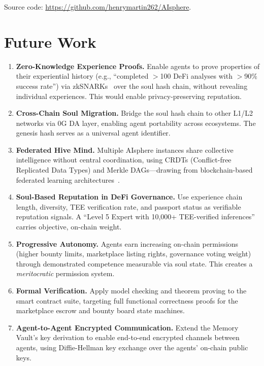 \documentclass[10pt,a4paper]{article}
\theoremstyle{definition}
\theoremstyle{plain}
\begin{document}
\noindent Source code: \url{https://github.com/henrymartin262/AIsphere}.


\section{Future Work}
\label{sec:future}

\begin{enumerate}[leftmargin=1.8em, itemsep=4pt, parsep=0pt]
  \item \textbf{Zero-Knowledge Experience Proofs.} Enable agents to prove properties of their experiential history (e.g., ``completed $>$100 DeFi analyses with $>$90\% success rate'') via zkSNARKs~\cite{zkml2024, zkml-survey2025} over the soul hash chain, without revealing individual experiences. This would enable privacy-preserving reputation.

  \item \textbf{Cross-Chain Soul Migration.} Bridge the soul hash chain to other L1/L2 networks via 0G DA layer, enabling agent portability across ecosystems. The genesis hash serves as a universal agent identifier.

  \item \textbf{Federated Hive Mind.} Multiple AIsphere instances share collective intelligence without central coordination, using CRDTs (Conflict-free Replicated Data Types) and Merkle DAGs---drawing from blockchain-based federated learning architectures~\cite{fl-blockchain2024}.

  \item \textbf{Soul-Based Reputation in DeFi Governance.} Use experience chain length, diversity, TEE verification rate, and passport status as verifiable reputation signals. A ``Level 5 Expert with 10,000+ TEE-verified inferences'' carries objective, on-chain weight.

  \item \textbf{Progressive Autonomy.} Agents earn increasing on-chain permissions (higher bounty limits, marketplace listing rights, governance voting weight) through demonstrated competence measurable via soul state. This creates a \emph{meritocratic} permission system.

  \item \textbf{Formal Verification.} Apply model checking and theorem proving to the smart contract suite, targeting full functional correctness proofs for the marketplace escrow and bounty board state machines.

  \item \textbf{Agent-to-Agent Encrypted Communication.} Extend the Memory Vault's key derivation to enable end-to-end encrypted channels between agents, using Diffie-Hellman key exchange over the agents' on-chain public keys.
\end{enumerate}
\end{document}
